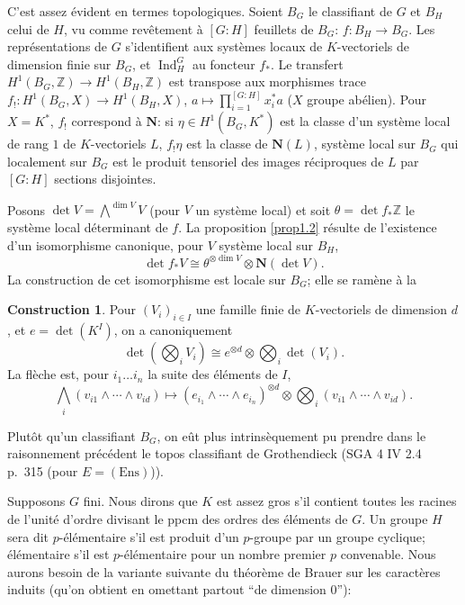 \documentclass[11pt,a4paper]{amsart}
\theoremstyle{plain}
\theoremstyle{definition}
\newtheorem{construction}[theorem]{Construction}
\DeclareMathOperator{\Ind}{Ind}
\newcommand{\dbZ}{\mathbb{Z}}
\def\dim{\mathop{\mathrm{dim}}\nolimits}
\newenvironment{para}{\par\noindent}{\par}
\begin{document}
C'est assez \'evident en termes topologiques. Soient $B_{G}$ le classifiant de $G$ et $B_{H}$ celui de $H$, vu comme rev\^etement \`a $[G:H]$ feuillets de $B_{G}$: $f: B_{H} \to B_{G}$. Les repr\'esentations de $G$ s'identifient aux syst\`emes locaux de $K$-vectoriels de dimension finie sur $B_{G}$, et $\Ind^{G}_{H}$ au foncteur $f_{*}$. Le transfert $H^{1}(B_{G},\dbZ) \to H^{1}(B_{H},\dbZ)$ est transpose aux morphismes trace $f_{!}: H^{1}(B_{G},X) \to H^{1}(B_{H},X)$, $a \mapsto \prod_{i=1}^{[G:H]} x_{i}^{*}a$ ($X$ groupe ab\'elien). Pour $X = K^{*}$, $f_{!}$ correspond \`a $\mathbf{N}$: si $\eta \in H^{1}(B_{G},K^{*})$ est la classe d'un syst\`eme local de rang $1$ de $K$-vectoriels $L$, $f_{!}\eta$ est la classe de $\mathbf{N}(L)$, syst\`eme local sur $B_{G}$ qui localement sur $B_{G}$ est le produit tensoriel des images r\'eciproques de $L$ par $[G:H]$ sections disjointes.

\begin{para}
Posons $\det V = \bigwedge^{\dim V} V$ (pour $V$ un syst\`eme local) et soit $\theta = \det f_{*}\dbZ$ le syst\`eme local d\'eterminant de $f$. La proposition \ref{prop1.2} r\'esulte de l'existence d'un isomorphisme canonique, pour $V$ syst\`eme local sur $B_{H}$,
\[
\det f_{*}V \cong \theta^{\otimes \dim V} \otimes \mathbf{N}(\det V).
\]
La construction de cet isomorphisme est locale sur $B_{G}$; elle se ram\`ene \`a la
\end{para}

\begin{construction}
Pour $(V_{i})_{i \in I}$ une famille finie de $K$-vectoriels de dimension $d$, et $e = \det(K^{I})$, on a canoniquement
\[
\det(\textstyle\bigotimes_{i} V_{i}) \cong e^{\otimes d} \otimes \textstyle\bigotimes_{i} \det(V_{i}).
\]
La fl\`eche est, pour $i_{1} \ldots i_{n}$ la suite des \'el\'ements de $I$,
\[
\textstyle\bigwedge_{i}(v_{i1} \wedge \cdots \wedge v_{id}) \longmapsto (e_{i_{1}} \wedge \cdots \wedge e_{i_{n}})^{\otimes d} \otimes \textstyle\bigotimes_{i}(v_{i1} \wedge \cdots \wedge v_{id}).
\]
\end{construction}

\begin{para}
Plut\^ot qu'un classifiant $B_{G}$, on e\^ut plus intrins\`equement pu prendre dans le raisonnement pr\'ec\'edent le topos classifiant de Grothendieck (SGA 4 IV 2.4 p.~315 (pour $E = (\text{Ens})$)).
\end{para}

\begin{para}
Supposons $G$ fini. Nous dirons que $K$ est assez gros s'il contient toutes les racines de l'unit\'e d'ordre divisant le ppcm des ordres des \'el\'ements de $G$. Un groupe $H$ sera dit $p$-\'el\'ementaire s'il est produit d'un $p$-groupe par un groupe cyclique; \'el\'ementaire s'il est $p$-\'el\'ementaire pour un nombre premier $p$ convenable. Nous aurons besoin de la variante suivante du th\'eor\`eme de Brauer sur les caract\`eres induits (qu'on obtient en omettant partout ``de dimension $0$''):
\end{para}
\end{document}
